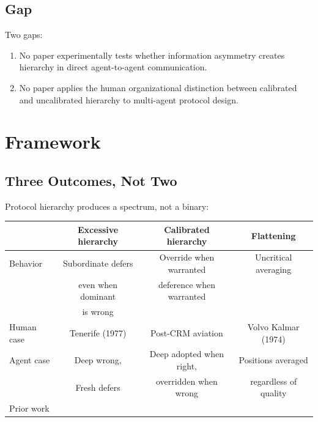 \documentclass[11pt]{article}
\theoremstyle{definition}
\begin{document}
\subsection{Gap}

Two gaps:
\begin{enumerate}[nosep]
    \item No paper experimentally tests whether information asymmetry creates hierarchy in direct agent-to-agent communication.
    \item No paper applies the human organizational distinction between calibrated and uncalibrated hierarchy to multi-agent protocol design.
\end{enumerate}

\section{Framework}
\label{sec:framework}

\subsection{Three Outcomes, Not Two}

Protocol hierarchy produces a spectrum, not a binary:

\begin{center}
\small
\begin{tabular}{@{}lccc@{}}
\toprule
& \textbf{Excessive hierarchy} & \textbf{Calibrated hierarchy} & \textbf{Flattening} \\
\midrule
Behavior & Subordinate defers & Override when warranted & Uncritical averaging \\
         & even when dominant  & deference when warranted & \\
         & is wrong            &                          & \\
\midrule
Human case & Tenerife (1977) & Post-CRM aviation & Volvo Kalmar (1974) \\
\midrule
Agent case & Deep wrong, & Deep adopted when right, & Positions averaged \\
           & Fresh defers & overridden when wrong & regardless of quality \\
\midrule
Prior work & \citet{janis1972groupthink} & \citet{helmreich1999crm} & \citet{pappu2026experts} \\
\bottomrule
\end{tabular}
\end{center}
\end{document}
